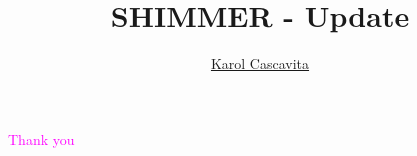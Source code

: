 \documentclass[10pt,aspectratio=169]{beamer}
\title[Shimmer update]{SHIMMER - Update}
\author[KC]{
	 \underline{Karol Cascavita}
}
\institute[DISMA]{DISMA - PoliTO}
\newcommand{\cmag}[1]{\textcolor{magenta}{#1}}
\begin{document}
\begin{frame}
\titlepage 
\end{frame}






\begin{frame}{}
	\begin{center}
	\Huge \cmag{Thank you}	
	\end{center}
\end{frame}
\end{document}
